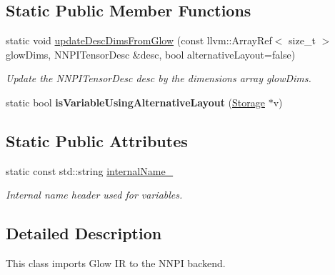 \subsection*{Static Public Member Functions}
\begin{DoxyCompactItemize}
\item 
\mbox{\label{classglow_1_1_n_n_p_i_importer_ad9ac243f873c5de0d834b705698ff659}} 
static void \hyperlink{classglow_1_1_n_n_p_i_importer_ad9ac243f873c5de0d834b705698ff659}{update\+Desc\+Dims\+From\+Glow} (const llvm\+::\+Array\+Ref$<$ size\+\_\+t $>$ glow\+Dims, N\+N\+P\+I\+Tensor\+Desc \&desc, bool alternative\+Layout=false)
\begin{DoxyCompactList}\small\item\em Update the N\+N\+P\+I\+Tensor\+Desc {\ttfamily desc} by the dimensions array {\ttfamily glow\+Dims}. \end{DoxyCompactList}\item 
\mbox{\label{classglow_1_1_n_n_p_i_importer_a0a936fa9849190019b1946e62fc263fb}} 
static bool {\bfseries is\+Variable\+Using\+Alternative\+Layout} (\hyperlink{classglow_1_1_storage}{Storage} $\ast$v)
\end{DoxyCompactItemize}
\subsection*{Static Public Attributes}
\begin{DoxyCompactItemize}
\item 
\mbox{\label{classglow_1_1_n_n_p_i_importer_a36c37cd720f8975e97729bad4b90106f}} 
static const std\+::string \hyperlink{classglow_1_1_n_n_p_i_importer_a36c37cd720f8975e97729bad4b90106f}{internal\+Name\+\_\+}
\begin{DoxyCompactList}\small\item\em Internal name header used for variables. \end{DoxyCompactList}\end{DoxyCompactItemize}


\subsection{Detailed Description}
This class imports Glow IR to the N\+N\+PI backend. 

